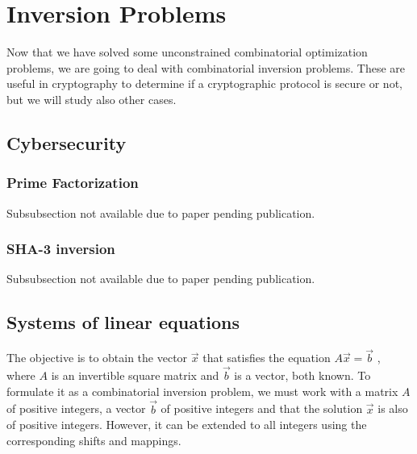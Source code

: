 \section{Inversion Problems}
Now that we have solved some unconstrained combinatorial optimization problems, we are going to deal with combinatorial inversion problems. These are useful in cryptography to determine if a cryptographic protocol is secure or not, but we will study also other cases.

\subsection{Cybersecurity}
\subsubsection{Prime Factorization}
{\color{red} Subsubsection not available due to paper pending publication.}






\subsubsection{SHA-3 inversion}
{\color{red} Subsubsection not available due to paper pending publication.}





\subsection{Systems of linear equations}
The objective is to obtain the vector $\vec{x}$ that satisfies the equation $A\vec{x}=\vec{b}$ , where $A$ is an invertible square matrix and $\vec{b}$ is a vector, both known. To formulate it as a combinatorial inversion problem, we must work with a matrix $A$ of positive integers, a vector $\vec{b}$ of positive integers and that the solution $\vec{x}$ is also of positive integers. However, it can be extended to all integers using the corresponding shifts and mappings.

